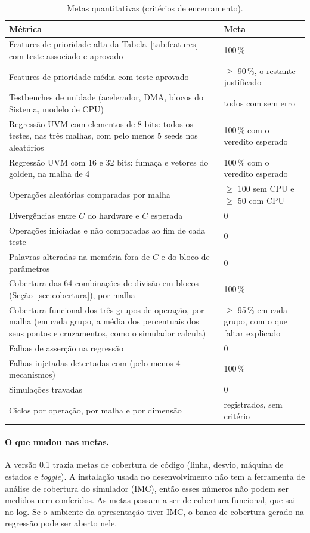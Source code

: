 \documentclass[10pt,a4paper]{article}
\newcommand{\code}[1]{\texttt{\detokenize{#1}}}
\begin{document}
\begin{table}[htbp]
\centering\small
\caption{Metas quantitativas (critérios de encerramento).}
\label{tab:metas}
\begin{tabular}{@{}L{10.2cm}L{5.2cm}@{}}
\toprule
Métrica & Meta\\
\midrule
Features de prioridade alta da Tabela~\ref{tab:features} com teste associado e aprovado & 100\,\%\\
Features de prioridade média com teste aprovado & $\geq$ 90\,\%, o restante justificado\\
Testbenches de unidade (acelerador, DMA, blocos do Sistema, modelo de CPU) & todos com
\code{RESUMO} sem erro\\
Regressão UVM com elementos de 8 bits: todos os testes, nas três malhas, com pelo menos 5 seeds nos
aleatórios & 100\,\% com o veredito esperado\\
Regressão UVM com 16 e 32 bits: fumaça e vetores do golden, na malha de 4 & 100\,\% com o veredito
esperado\\
Operações aleatórias comparadas por malha & $\geq$ 100 sem CPU e $\geq$ 50 com CPU\\
Divergências entre $C$ do hardware e $C$ esperada & 0\\
Operações iniciadas e não comparadas ao fim de cada teste & 0\\
Palavras alteradas na memória fora de $C$ e do bloco de parâmetros & 0\\
Cobertura das 64 combinações de divisão em blocos (Seção~\ref{sec:cobertura}), por malha &
100\,\%\\
Cobertura funcional dos três grupos de operação, por malha (em cada grupo, a média dos percentuais
dos seus pontos e cruzamentos, como o simulador calcula) & $\geq$ 95\,\% em cada grupo, com o que
faltar explicado\\
Falhas de asserção na regressão & 0\\
Falhas injetadas detectadas com \code{TEST FAIL} (pelo menos 4 mecanismos) & 100\,\%\\
Simulações travadas & 0\\
Ciclos por operação, por malha e por dimensão & registrados, sem critério\\
\bottomrule
\end{tabular}
\end{table}

\paragraph{O que mudou nas metas.}
A versão 0.1 trazia metas de cobertura de código (linha, desvio, máquina de estados e
\emph{toggle}). A instalação usada no desenvolvimento não tem a ferramenta de análise de cobertura
do simulador (IMC), então esses números não podem ser medidos nem conferidos. As metas passam a ser
de cobertura funcional, que sai no log. Se o ambiente da apresentação tiver IMC, o banco de
cobertura gerado na regressão pode ser aberto nele.
\end{document}
